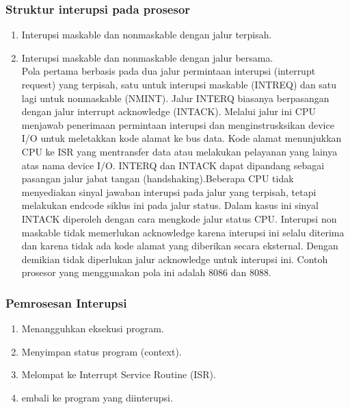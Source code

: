 \documentclass[12pt]{article}
\begin{document}
\subsubsection{Struktur interupsi pada prosesor}
\begin{enumerate}
    \item Interupsi maskable dan nonmaskable dengan jalur terpisah.
\item Interupsi maskable dan nonmaskable dengan jalur bersama.\\
    Pola pertama berbasis pada dua jalur permintaan interupsi (interrupt request) yang terpisah, satu untuk interupsi maskable (INTREQ) dan satu lagi untuk nonmaskable (NMINT). Jalur INTERQ biasanya berpasangan dengan jalur interrupt acknowledge (INTACK). Melalui jalur ini CPU menjawab penerimaan permintaan interupsi dan menginstrusksikan device I/O untuk meletakkan kode alamat ke bus data. Kode alamat menunjukkan CPU ke ISR yang mentransfer data atau melakukan pelayanan yang lainya atas nama device I/O. INTERQ dan INTACK dapat dipandang sebagai pasangan jalur jabat tangan (handshaking).Beberapa CPU tidak menyediakan sinyal jawaban interupsi pada jalur yang terpisah, tetapi melakukan endcode siklus ini pada jalur status. Dalam kasus ini sinyal INTACK diperoleh dengan cara mengkode jalur status CPU. Interupsi non maskable tidak memerlukan acknowledge karena interupsi ini selalu diterima dan karena tidak ada kode alamat yang diberikan secara eksternal. Dengan demikian tidak diperlukan jalur acknowledge untuk interupsi ini. Contoh prosesor yang menggunakan pola ini adalah 8086 dan 8088.
\end{enumerate}
\subsubsection{Pemrosesan Interupsi}
\begin{enumerate}
    \item Menangguhkan eksekusi program.
    \item Menyimpan status program (context).
    \item Melompat ke Interrupt Service Routine (ISR).
    \item embali ke program yang diinterupsi.
\end{enumerate}
\end{document}

